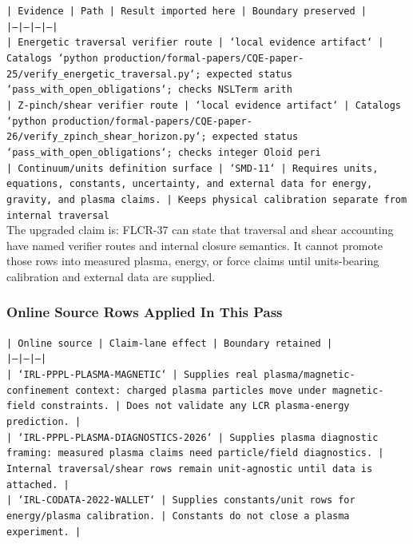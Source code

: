 \documentclass[11pt]{article}
\begin{document}
\noindent\texttt{| Evidence | Path | Result imported here | Boundary preserved |}\\
\noindent\texttt{|---|---|---|---|}\\
\noindent\texttt{| Energetic traversal verifier route | `local evidence artifact` | Catalogs `python production/formal-papers/CQE-paper-25/verify\_energetic\_traversal.py`; expected status `pass\_with\_open\_obligations`; checks NSLTerm arith}\\
\noindent\texttt{| Z-pinch/shear verifier route | `local evidence artifact` | Catalogs `python production/formal-papers/CQE-paper-26/verify\_zpinch\_shear\_horizon.py`; expected status `pass\_with\_open\_obligations`; checks integer Oloid peri}\\
\noindent\texttt{| Continuum/units definition surface | `SMD-11` | Requires units, equations, constants, uncertainty, and external data for energy, gravity, and plasma claims. | Keeps physical calibration separate from internal traversal}\\

The upgraded claim is: FLCR-37 can state that traversal and shear accounting have named verifier routes and internal closure semantics. It cannot promote those rows into measured plasma, energy, or force claims until units-bearing calibration and external data are supplied.

\subsubsection*{Online Source Rows Applied In This Pass}

\noindent\texttt{| Online source | Claim-lane effect | Boundary retained |}\\
\noindent\texttt{|---|---|---|}\\
\noindent\texttt{| `IRL-PPPL-PLASMA-MAGNETIC` | Supplies real plasma/magnetic-confinement context: charged plasma particles move under magnetic-field constraints. | Does not validate any LCR plasma-energy prediction. |}\\
\noindent\texttt{| `IRL-PPPL-PLASMA-DIAGNOSTICS-2026` | Supplies plasma diagnostic framing: measured plasma claims need particle/field diagnostics. | Internal traversal/shear rows remain unit-agnostic until data is attached. |}\\
\noindent\texttt{| `IRL-CODATA-2022-WALLET` | Supplies constants/unit rows for energy/plasma calibration. | Constants do not close a plasma experiment. |}\\
\end{document}
